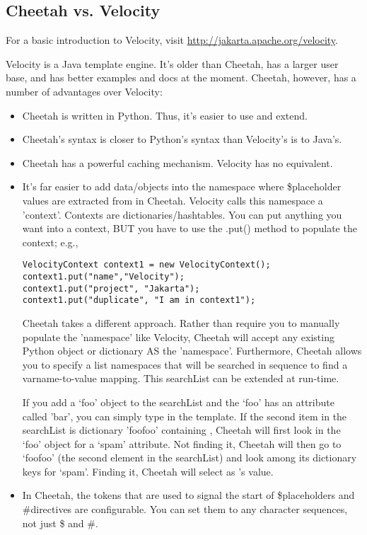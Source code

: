 
\subsection{Cheetah vs. Velocity}
\label{comparisons.velocity}

For a basic introduction to Velocity, visit
\url{http://jakarta.apache.org/velocity}.

Velocity is a Java template engine.  It's older than Cheetah, has a larger user
base, and has better examples and docs at the moment. Cheetah, however, has a
number of advantages over Velocity:
\begin{itemize}
\item Cheetah is written in Python. Thus, it's easier to use and extend.
\item Cheetah's syntax is closer to Python's syntax than Velocity's is to
Java's.
\item Cheetah has a powerful caching mechanism.  Velocity has no equivalent.
\item It's far easier to add data/objects into the namespace where \$placeholder
     values are extracted from in Cheetah.  Velocity calls this namespace a 'context'.
     Contexts are dictionaries/hashtables. You can put anything you want into a
     context, BUT you have to use the .put() method to populate the context; 
     e.g.,

\begin{verbatim}
VelocityContext context1 = new VelocityContext();
context1.put("name","Velocity");
context1.put("project", "Jakarta");
context1.put("duplicate", "I am in context1");
\end{verbatim}
     
     Cheetah takes a different approach. Rather than require you to manually
     populate the 'namespace' like Velocity, Cheetah will accept any existing
     Python object or dictionary AS the 'namespace'.  Furthermore, Cheetah
     allows you to specify a list namespaces that will be searched in sequence
     to find a varname-to-value mapping.  This searchList can be extended at
     run-time.
     
    If you add a `foo' object to the searchList and the `foo' has an attribute
    called 'bar', you can simply type  in the template.  If the
    second item in the searchList is dictionary 'foofoo' containing
    , Cheetah will first look in the `foo'
    object for a `spam' attribute.  Not finding it, Cheetah will then go to
    `foofoo' (the second element in the searchList) and look among its
    dictionary keys for `spam'.  Finding it, Cheetah will select
     as 's value.

\item In Cheetah, the tokens that are used to signal the start of
     \$placeholders and \#directives are configurable. You can set them to any
     character sequences, not just \$ and \#.
\end{itemize}


